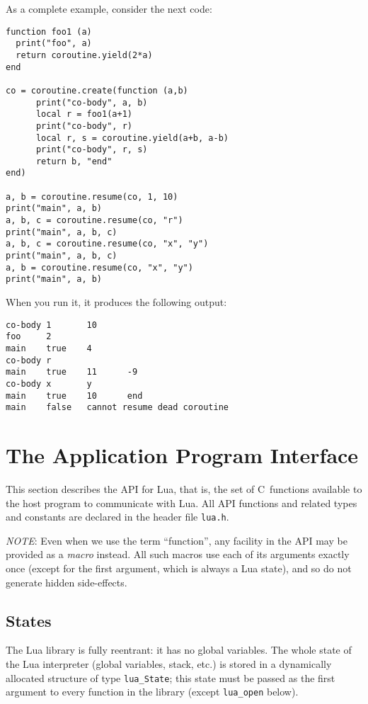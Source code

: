 \documentclass[11pt,twoside]{article}
\makeatletter
\newcommand{\DefAPI}[1]{\index{C API!#1@{\tt #1}}}
\newcommand{\Q}[1]{``#1''}
\newcommand{\C}[1]{}
\newcommand{\NOTE}{\par\medskip\noindent\emph{NOTE}: }
\makeatother
\begin{document}
As a complete example,
consider the next code:
\begin{verbatim}
function foo1 (a)
  print("foo", a)
  return coroutine.yield(2*a)
end

co = coroutine.create(function (a,b)
      print("co-body", a, b)
      local r = foo1(a+1)
      print("co-body", r)
      local r, s = coroutine.yield(a+b, a-b)
      print("co-body", r, s)
      return b, "end"
end)
       
a, b = coroutine.resume(co, 1, 10)
print("main", a, b)
a, b, c = coroutine.resume(co, "r")
print("main", a, b, c)
a, b, c = coroutine.resume(co, "x", "y")
print("main", a, b, c)
a, b = coroutine.resume(co, "x", "y")
print("main", a, b)
\end{verbatim}
When you run it, it produces the following output:
\begin{verbatim}
co-body 1       10
foo     2
main    true    4
co-body r
main    true    11      -9
co-body x       y
main    true    10      end
main    false   cannot resume dead coroutine
\end{verbatim}



\C{------------------------------------------------------------------------------}
\section{The Application Program Interface}\label{API}

This section describes the API for Lua, that is,
the set of C~functions available to the host program to communicate
with Lua.
All API functions and related types and constants
are declared in the header file \verb|lua.h|.

\NOTE
Even when we use the term \Q{function},
any facility in the API may be provided as a \emph{macro} instead.
All such macros use each of its arguments exactly once
(except for the first argument, which is always a Lua state),
and so do not generate hidden side-effects.


\subsection{States} \label{mangstate}

The Lua library is fully reentrant:
it has no global variables.
The whole state of the Lua interpreter
(global variables, stack, etc.)
is stored in a dynamically allocated structure of type \verb|lua_State|;
\DefAPI{lua_State}
this state must be passed as the first argument to
every function in the library (except \verb|lua_open| below).
\end{document}
